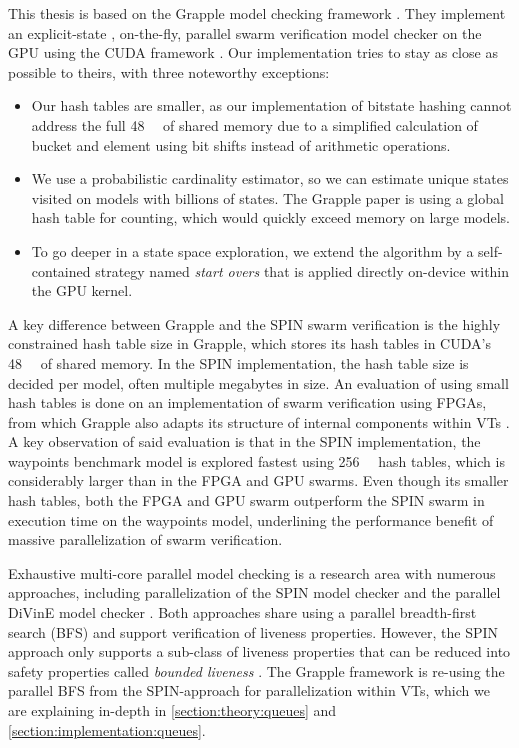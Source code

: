 \documentclass[
fancyheadings, %
%
%
]{stsreprt}
\begin{document}
This thesis is based on the Grapple model checking framework \cite{DeFrancisco2020.Grapple}.
They implement an explicit-state \cite{Holzmann2018.Explicit-State-Model-Checking}, on-the-fly, parallel swarm verification model checker on the GPU using the CUDA framework \cite{CUDA-Programming-Guide}.
Our implementation tries to stay as close as possible to theirs, with three noteworthy exceptions:

\begin{itemize}
    \item Our hash tables are smaller, as our implementation of bitstate hashing cannot address the full \SI{48}{\kibi\byte} of shared memory due to a simplified calculation of bucket and element using bit shifts instead of arithmetic operations.
    \item We use a probabilistic cardinality estimator, so we can estimate unique states visited on models with billions of states.
          The Grapple paper is using a global hash table for counting, which would quickly exceed memory on large models.
    \item To go deeper in a state space exploration, we extend the algorithm by a self-contained strategy named \emph{start overs} that is applied directly on-device within the GPU kernel.
\end{itemize}

A key difference between Grapple and the SPIN swarm verification is the highly constrained hash table size in Grapple, which stores its hash tables in CUDA's \SI{48}{\kibi\byte} of shared memory.
In the SPIN implementation, the hash table size is decided per model, often multiple megabytes in size.
An evaluation of using small hash tables is done on an implementation of swarm verification using FPGAs, from which Grapple also adapts its structure of internal components within VTs \cite{Cho2018}.
A key observation of said evaluation is that in the SPIN implementation, the waypoints benchmark model is explored fastest using \SI{256}{\mega\byte} hash tables, which is considerably larger than in the FPGA and GPU swarms.
Even though its smaller hash tables, both the FPGA and GPU swarm outperform the SPIN swarm in execution time on the waypoints model, underlining the performance benefit of massive parallelization of swarm verification.

Exhaustive multi-core parallel model checking is a research area with numerous approaches, including parallelization of the SPIN model checker \cite{Holzmann2004} and the parallel DiVinE model checker \cite{Barnat2008, Barnat2007}.
Both approaches share using a parallel breadth-first search (BFS) and support verification of liveness properties.
However, the SPIN approach only supports a sub-class of liveness properties that can be reduced into safety properties called \emph{bounded liveness} \cite{Holzmann2012.Paralellizing-SPIN}.
The Grapple framework is re-using the parallel BFS from the SPIN-approach for parallelization within VTs, which we are explaining in-depth in \cref{section:theory:queues} and \cref{section:implementation:queues}.
\end{document}

